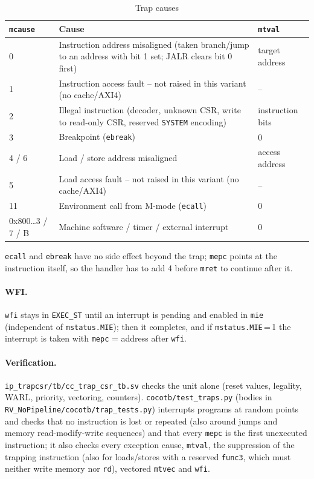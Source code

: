 \begin{table}[htbp]
\caption{Trap causes}
\label{tab:asTrapCause}
\centering
{\footnotesize
\begin{tabularx}{\textwidth}{|l |X |X |}
  \hline
  \texttt{mcause} & Cause & \texttt{mtval} \\
  \hline
  \hline
  0 & Instruction address misaligned (taken branch/jump to an address with
      bit 1 set; JALR clears bit 0 first) & target address \\
  \hline
  1 & Instruction access fault -- not raised in this variant (no cache/AXI4) & -- \\
  \hline
  2 & Illegal instruction (decoder, unknown CSR, write to read-only CSR,
      reserved \texttt{SYSTEM} encoding) & instruction bits \\
  \hline
  3 & Breakpoint (\texttt{ebreak}) & 0 \\
  \hline
  4 / 6 & Load / store address misaligned & access address \\
  \hline
  5 & Load access fault -- not raised in this variant (no cache/AXI4) & -- \\
  \hline
  11 & Environment call from M-mode (\texttt{ecall}) & 0 \\
  \hline
  \hline
  0x800\ldots3 / 7 / B & Machine software / timer / external interrupt & 0 \\
  \hline
\end{tabularx}}
\end{table}

\texttt{ecall} and \texttt{ebreak} have no side effect beyond the trap;
\texttt{mepc} points at the instruction itself, so the handler has to add 4
before \texttt{mret} to continue after it.

\paragraph{WFI.}
\texttt{wfi} stays in \texttt{EXEC\_ST} until an
interrupt is pending and enabled in \texttt{mie} (independent of
\texttt{mstatus.MIE}); then it completes, and if \texttt{mstatus.MIE}\,=\,1
the interrupt is taken with \texttt{mepc} = address after \texttt{wfi}.

\paragraph{Verification.}
\texttt{ip\_trapcsr/tb/cc\_trap\_csr\_tb.sv} checks the unit alone (reset
values, legality, WARL, priority, vectoring, counters).
\texttt{cocotb/test\_traps.py} (bodies in
\texttt{RV\_NoPipeline/cocotb/trap\_tests.py}) interrupts programs at random
points and checks that no instruction is lost or repeated (also around
jumps and memory read-modify-write sequences) and that every \texttt{mepc}
is the first unexecuted instruction; it also checks every exception cause,
\texttt{mtval}, the suppression of the trapping instruction (also for
loads/stores with a reserved \texttt{func3}, which must neither write
memory nor \texttt{rd}), vectored \texttt{mtvec} and \texttt{wfi}.

